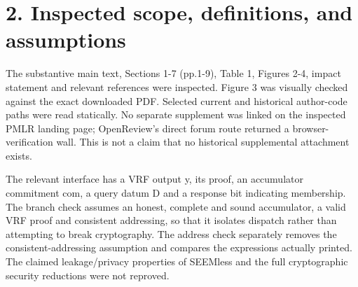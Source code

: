 \documentclass[10pt]{article}
\begin{document}
\section*{2. Inspected scope, definitions, and assumptions}
The substantive main text, Sections 1-7 (pp.1-9), Table 1, Figures 2-4, impact statement and relevant references were inspected. Figure 3 was visually checked against the exact downloaded PDF. Selected current and historical author-code paths were read statically. No separate supplement was linked on the inspected PMLR landing page; OpenReview’s direct forum route returned a browser-verification wall. This is not a claim that no historical supplemental attachment exists.\par
The relevant interface has a VRF output y, its proof, an accumulator commitment com, a query datum D and a response bit indicating membership. The branch check assumes an honest, complete and sound accumulator, a valid VRF proof and consistent addressing, so that it isolates dispatch rather than attempting to break cryptography. The address check separately removes the consistent-addressing assumption and compares the expressions actually printed. The claimed leakage/privacy properties of SEEMless and the full cryptographic security reductions were not reproved.\par
\end{document}
